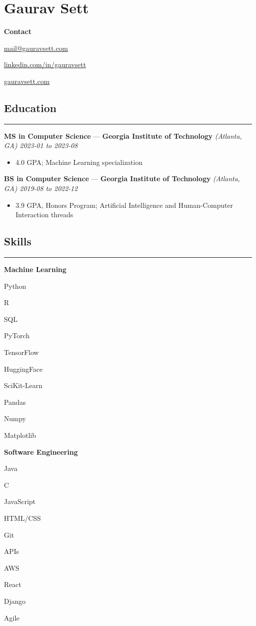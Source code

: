 \documentclass[10pt]{article}
\newcommand{\resumeHeading}[1]{
    \subsection*{#1}
    \hrule
    \vspace*{5pt}
}
\newcommand{\resumeSubHeading}[5]{
    \vspace*{5pt}
    \textbf{#1} — \textbf{#2} \textsl{(#3) \hfill #4 to #5}
}
\newcommand{\resumeListHeading}[1]{\vspace*{5pt}\textbf{#1}}
\begin{document}
\section*{Gaurav Sett}

\textbf{Contact}
\begin{itemize*}[label=$|$]
    \item \href{mailto:mail@gauravsett.com}{mail@gauravsett.com}
    \item \href{https://linkedin.com/in/gauravsett}{linkedin.com/in/gauravsett}
    \item \href{https://gauravsett.com}{gauravsett.com}
\end{itemize*}



\resumeHeading{Education}

\resumeSubHeading
    {MS in Computer Science}
    {Georgia Institute of Technology}
    {Atlanta, GA}
    {2023-01}
    {2023-08}
\begin{itemize}
    \item 4.0 GPA;\: 
        Machine Learning specialization
\end{itemize}

\resumeSubHeading
    {BS in Computer Science}
    {Georgia Institute of Technology}
    {Atlanta, GA}
    {2019-08}
    {2022-12}
\begin{itemize}
    \item 3.9 GPA, Honors Program;\: 
        Artificial Intelligence and Human-Computer Interaction threads
\end{itemize}



\resumeHeading{Skills}

\resumeListHeading{Machine Learning}
\begin{itemize*}[label=$|$]
    \item Python
    \item R
    \item SQL
    \item PyTorch
    \item TensorFlow
    \item HuggingFace
    \item SciKit-Learn
    \item Pandas
    \item Numpy
    \item Matplotlib
\end{itemize*}

\resumeListHeading{Software Engineering}
\begin{itemize*}[label=$|$]
    \item Java
    \item C
    \item JavaScript 
    \item HTML/CSS 
    \item Git
    \item APIs
    \item AWS
    \item React
    \item Django
    \item Agile
\end{itemize*}
\end{document}
